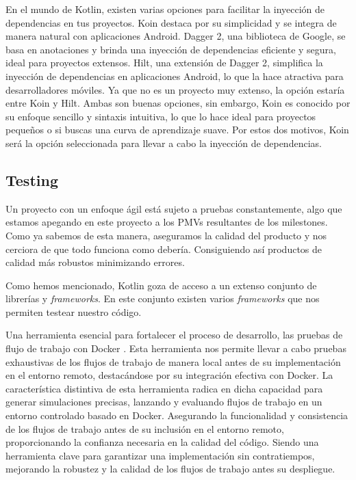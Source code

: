 En el mundo de Kotlin, existen varias opciones para facilitar la inyección de dependencias en tus 
proyectos. Koin destaca por su simplicidad y se integra de manera natural con aplicaciones Android. 
Dagger 2, una biblioteca de Google, se basa en anotaciones y brinda una inyección de dependencias 
eficiente y segura, ideal para proyectos extensos. Hilt, una extensión de Dagger 2, simplifica la 
inyección de dependencias en aplicaciones Android, lo que la hace atractiva para desarrolladores 
móviles. Ya que no es un proyecto muy extenso, la opción estaría entre Koin y Hilt. Ambas son buenas 
opciones, sin embargo, Koin es conocido por su enfoque sencillo y sintaxis intuitiva, lo que lo hace 
ideal para proyectos pequeños o si buscas una curva de aprendizaje suave. Por estos dos motivos, Koin 
será la opción seleccionada para llevar a cabo la inyección de dependencias.

\subsection{Testing}

Un proyecto con un enfoque ágil está sujeto a pruebas constantemente, algo que estamos apegando en este 
proyecto a los PMVs resultantes de los milestones. Como ya sabemos de esta manera, aseguramos la 
calidad del producto y nos cerciora de que todo funciona como debería. Consiguiendo así productos de 
calidad más robustos minimizando errores.

Como hemos mencionado, Kotlin goza de acceso a un extenso conjunto de librerías y \textit{frameworks}. 
En este conjunto existen varios \textit{frameworks} que nos permiten testear nuestro código.

Una herramienta esencial para fortalecer el proceso de desarrollo, las pruebas de flujo de trabajo con Docker 
\cite{GI_act}. Esta herramienta nos permite llevar a cabo pruebas exhaustivas de los flujos de trabajo de manera 
local antes de su implementación en el entorno remoto, destacándose por su integración efectiva con Docker. La 
característica distintiva de esta herramienta radica en dicha capacidad para generar simulaciones precisas, 
lanzando y evaluando flujos de trabajo en un entorno controlado basado en Docker. Asegurando la funcionalidad y 
consistencia de los flujos de trabajo antes de su inclusión en el entorno remoto, proporcionando la confianza 
necesaria en la calidad del código. Siendo una herramienta clave para garantizar una implementación sin 
contratiempos, mejorando la robustez y la calidad de los flujos de trabajo antes su despliegue.


